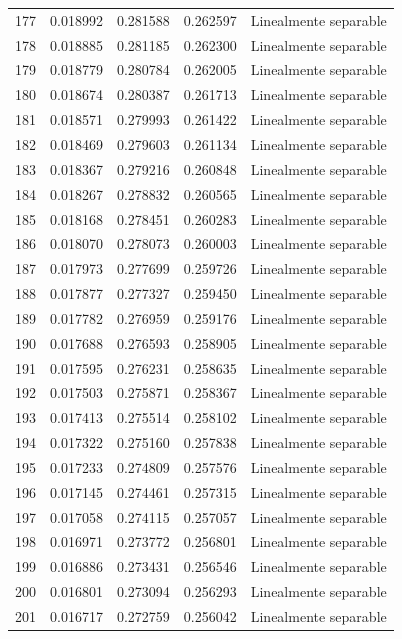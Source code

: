 \begin{tabular}{lllll}
177 & 0.018992 & 0.281588 & 0.262597 & Linealmente separable \\
178 & 0.018885 & 0.281185 & 0.262300 & Linealmente separable \\
179 & 0.018779 & 0.280784 & 0.262005 & Linealmente separable \\
180 & 0.018674 & 0.280387 & 0.261713 & Linealmente separable \\
181 & 0.018571 & 0.279993 & 0.261422 & Linealmente separable \\
182 & 0.018469 & 0.279603 & 0.261134 & Linealmente separable \\
183 & 0.018367 & 0.279216 & 0.260848 & Linealmente separable \\
184 & 0.018267 & 0.278832 & 0.260565 & Linealmente separable \\
185 & 0.018168 & 0.278451 & 0.260283 & Linealmente separable \\
186 & 0.018070 & 0.278073 & 0.260003 & Linealmente separable \\
187 & 0.017973 & 0.277699 & 0.259726 & Linealmente separable \\
188 & 0.017877 & 0.277327 & 0.259450 & Linealmente separable \\
189 & 0.017782 & 0.276959 & 0.259176 & Linealmente separable \\
190 & 0.017688 & 0.276593 & 0.258905 & Linealmente separable \\
191 & 0.017595 & 0.276231 & 0.258635 & Linealmente separable \\
192 & 0.017503 & 0.275871 & 0.258367 & Linealmente separable \\
193 & 0.017413 & 0.275514 & 0.258102 & Linealmente separable \\
194 & 0.017322 & 0.275160 & 0.257838 & Linealmente separable \\
195 & 0.017233 & 0.274809 & 0.257576 & Linealmente separable \\
196 & 0.017145 & 0.274461 & 0.257315 & Linealmente separable \\
197 & 0.017058 & 0.274115 & 0.257057 & Linealmente separable \\
198 & 0.016971 & 0.273772 & 0.256801 & Linealmente separable \\
199 & 0.016886 & 0.273431 & 0.256546 & Linealmente separable \\
200 & 0.016801 & 0.273094 & 0.256293 & Linealmente separable \\
201 & 0.016717 & 0.272759 & 0.256042 & Linealmente separable \\

\end{tabular}
